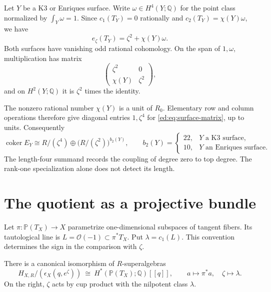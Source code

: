 \begin{example}
\label{ed:ex:surface}
Let $Y$ be a K3 or Enriques surface. Write $\omega\in H^4(Y;\mathbb Q)$
for the point class normalized by $\int_Y\omega=1$.
Since $c_1(T_Y)=0$ rationally and $c_2(T_Y)=\chi(Y)\omega$, we have
\[
 e_\zeta(T_Y)=\zeta^2+\chi(Y)\omega.
\]
Both surfaces have vanishing odd rational cohomology. On the span of
$1,\omega$, multiplication has matrix
\begin{equation}\label{ed:eq:surface-matrix}
 \begin{pmatrix}\zeta^2&0\\ \chi(Y)&\zeta^2\end{pmatrix},
\end{equation}
and on $H^2(Y;\mathbb Q)$ it is $\zeta^2$ times the identity.

The nonzero rational number $\chi(Y)$ is a unit of $R_0$.
Elementary row and column operations therefore give diagonal entries
$1,\zeta^4$ for \eqref{ed:eq:surface-matrix}, up to units. Consequently
\begin{equation}\label{ed:eq:surface-cokernel}
 \operatorname{coker}E_Y\cong
 R/(\zeta^4)\oplus\bigl(R/(\zeta^2)\bigr)^{b_2(Y)},
 \qquad b_2(Y)=
 \begin{cases}22,&Y\text{ a K3 surface},\\10,&Y\text{ an Enriques surface}.
 \end{cases}
\end{equation}
The length-four summand records the coupling of degree zero to top
degree. The rank-one specialization alone does not detect its length.
\end{example}

\section{The quotient as a projective bundle}
\label{ed:sec:projective}

Let $\pi:\mathbb P(T_X)\to X$ parametrize one-dimensional subspaces
of tangent fibers. Its tautological line is
$L=\mathcal O(-1)\subset\pi^*T_X$. Put $\lambda=c_1(L)$.
This convention determines the sign in the comparison with $\zeta$.

\begin{theorem}\label{ed:thm:projective}
There is a canonical isomorphism of $R$-superalgebras
\begin{equation}\label{ed:eq:projective}
 H_{X,R}/(\epsilon_X(q,e^\zeta))
 \ \cong\ H^*(\mathbb P(T_X);\mathbb Q)[[q]],
 \qquad a\longmapsto\pi^*a,\quad\zeta\longmapsto\lambda.
\end{equation}
On the right, $\zeta$ acts by cup product with the nilpotent class
$\lambda$.
\end{theorem}

